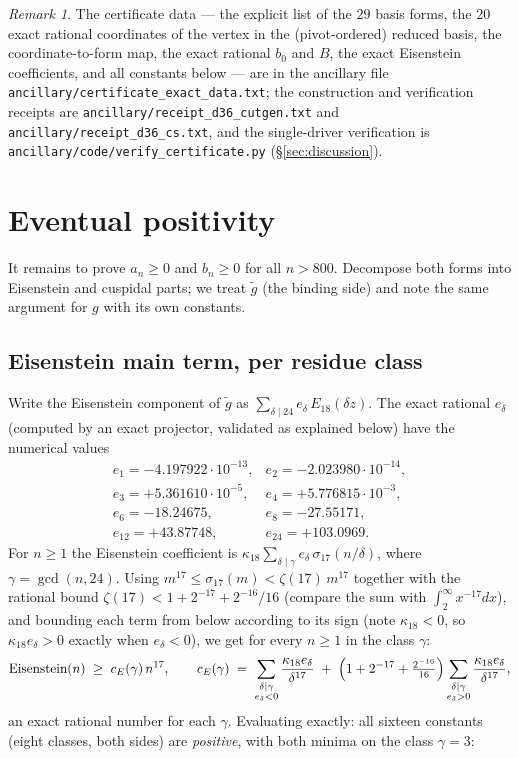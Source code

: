 \documentclass[11pt]{article}
\theoremstyle{remark}
\newtheorem{remark}[theorem]{Remark}
\begin{document}
\begin{remark}
The certificate data --- the explicit list of the $29$ basis forms, the
$20$ exact rational coordinates of the vertex in the (pivot-ordered)
reduced basis, the coordinate-to-form map, the exact rational $b_0$ and
$B$, the exact Eisenstein coefficients, and all constants below --- are
in the ancillary file \texttt{ancillary/certificate\_exact\_data.txt};
the construction and verification receipts are
\texttt{ancillary/receipt\_d36\_cutgen.txt} and
\texttt{ancillary/receipt\_d36\_cs.txt}, and the single-driver
verification is \texttt{ancillary/code/verify\_certificate.py}
(\S\ref{sec:discussion}).
\end{remark}

\section{Eventual positivity}\label{sec:tail}

It remains to prove $a_n\ge0$ and $b_n\ge0$ for all $n>800$. Decompose
both forms into Eisenstein and cuspidal parts; we treat $\tilde g$ (the
binding side) and note the same argument for $g$ with its own constants.

\subsection{Eisenstein main term, per residue class}

Write the Eisenstein component of $\tilde g$ as
$\sum_{\delta\mid24}e_\delta\,E_{18}(\delta z)$. The exact rational
$e_\delta$ (computed by an exact projector, validated as explained
below) have the numerical values
\[
\begin{array}{ll}
e_1=-4.197922\cdot10^{-13}, & e_2=-2.023980\cdot10^{-14}, \\
e_3=+5.361610\cdot10^{-5}, & e_4=+5.776815\cdot10^{-3}, \\
e_6=-18.24675, & e_8=-27.55171, \\
e_{12}=+43.87748, & e_{24}=+103.0969.
\end{array}
\]
For $n\ge1$ the Eisenstein coefficient is
$\kappa_{18}\sum_{\delta\mid\gamma}e_\delta\,\sigma_{17}(n/\delta)$,
where $\gamma=\gcd(n,24)$. Using
$m^{17}\le\sigma_{17}(m)<\zeta(17)\,m^{17}$ together with the rational
bound $\zeta(17)<1+2^{-17}+2^{-16}/16$ (compare the sum with
$\int_2^\infty x^{-17}dx$), and bounding each term from below according
to its sign (note $\kappa_{18}<0$, so $\kappa_{18}e_\delta>0$ exactly
when $e_\delta<0$), we get for every $n\ge1$ in the class $\gamma$:
\begin{equation}\label{eq:guard}
\text{Eisenstein}(n)\;\ge\;c_E(\gamma)\,n^{17},
\qquad
c_E(\gamma)\;=\;
\sum_{\substack{\delta\mid\gamma\\ e_\delta<0}}
\frac{\kappa_{18}e_\delta}{\delta^{17}}
\;+\;
\Bigl(1+2^{-17}+\tfrac{2^{-16}}{16}\Bigr)
\sum_{\substack{\delta\mid\gamma\\ e_\delta>0}}
\frac{\kappa_{18}e_\delta}{\delta^{17}},
\end{equation}
an exact rational number for each $\gamma$. Evaluating exactly: all
sixteen constants (eight classes, both sides) are \emph{positive},
with both minima on the class $\gamma=3$:
\end{document}
